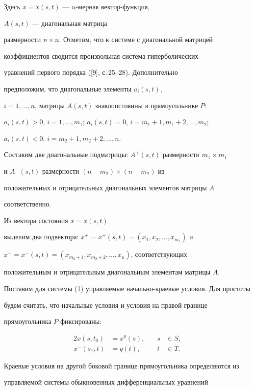 Здесь $x=x(s,t)$ --- $n$-мерная вектор-функция,


$A(s,t)$ --- диагональная матрица


размерности $n\times n$. Отметим, что к системе с диагональной матрицей 


коэффициентов сводится произвольная система гиперболических


уравнений первого порядка ([9], с.\,25--28). Дополнительно


предположим, что диагональные элементы $a_i(s,t)$,


$i=1,\dotsc,n$, матрицы $A(s,t)$ знакопостоянны в прямоугольнике $P$:


$a_i(s,t)>0$, $i=1,\dotsc,m_1$; $a_i(s,t)=0$, $i=m_1+1,m_1+2,\dotsc, m_2$;


$a_i(s,t)<0$, $i=m_2+1, m_2+2,\dotsc, n$.


Составим две диагональные подматрицы: $A^+(s,t)$ размерности $m_1\times m_1$


и $A^-(s,t)$ размерности $(n-m_2)\times (n-m_2)$ из


положительных и отрицательных диагональных элементов матрицы $A$


соответственно.


Из вектора состояния $x=x(s,t)$


выделим два подвектора: $x^+=x^+(s,t)=(x_1,x_2,\dotsc,x_{m_1})$ и


$x^-=x^-(s,t)=(x_{m_2+1},x_{m_2+2},\dotsc, x_n)$, соответствующих


положительным и отрицательным диагональным элементам матрицы $A$.





Поставим для системы (1) управляемые начально-краевые условия. Для простоты


будем считать, что начальные условия и условия на правой границе 


прямоугольника $P$ фиксированы:


\begin{alignat}{2}


x(s,t_0)&=x^0(s),&\quad s&\in S, \\


%


x^-(s_1,t)&=q(t),&\quad t&\in T.


\end{alignat}


Краевые условия на другой боковой границе прямоугольника определяются из


управляемой системы обыкновенных дифференциальных уравнений


